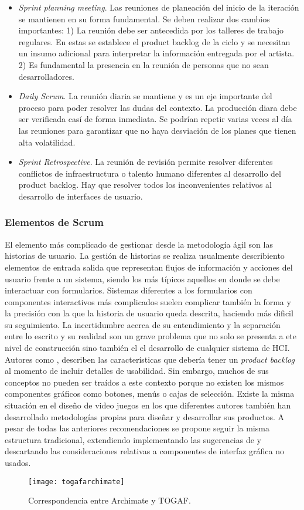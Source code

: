 \begin{itemize}

  \item \textit{Sprint planning meeting}. Las reuniones de planeación del inicio de la iteración se mantienen en su forma fundamental. Se deben realizar dos cambios importantes: 1) La reunión debe ser antecedida por los talleres de trabajo regulares. En estas se establece el product backlog de la ciclo y se necesitan un insumo adicional para interpretar la información entregada por el artista. 2)  Es fundamental la presencia en la reunión de personas que no sean desarrolladores.

  \item \textit{Daily Scrum}. La reunión diaria se mantiene y es un eje importante del proceso para poder resolver las dudas del contexto. La producción diara debe ser verificada casí de forma inmediata. Se podrían repetir varias veces al día las reuniones para garantizar que no haya desviación de los planes que tienen alta volatilidad.

  \item \textit{Sprint Retrospective}. La reunión de revisión permite resolver diferentes conflictos de infraestructura o talento humano diferentes al desarrollo del product backlog. Hay que resolver todos los inconvenientes relativos al desarrollo de interfaces de usuario.

\end{itemize}

\subsubsection{Elementos de Scrum}

El elemento más complicado de gestionar desde la metodología ágil son las historias de usuario. La gestión de historias se realiza usualmente describiento elementos de entrada salida que representan flujos de información y acciones del usuario frente a un sistema, siendo los más típicos aquellos en donde se debe interactuar con formularios. Sistemas diferentes a los formularios con componentes interactivos más complicados suelen complicar también la forma y la precisión con la que la historia de usuario queda descrita, haciendo más dificil su seguimiento. La incertidumbre acerca de su entendimiento y la separación entre lo escrito y su realidad son un grave problema que no solo se presenta a ete nivel de construcción sino también el el desarrollo de cualquier sistema de HCI. Autores como \cite{moreno2012agile}, describen las características que debería tener un \textit{product backlog} al momento de incluir detalles de usabilidad. Sin embargo, muchos de sus conceptos no pueden ser traídos a este contexto porque no existen los mismos componentes gráficos como botones, menús o cajas de selección. Existe la misma situación en el diseño de video juegos en los que diferentes autores también han desarrollado metodologías propias para diseñar y desarrollar sus productos. A pesar de todas las anteriores recomendaciones se propone seguir la misma estructura tradicional, extendiendo implementando las sugerencias de \cite{moreno2012agile} y descartando las consideraciones relativas a componentes de interfaz gráfica no usados.

\begin{figure}[h]
\label{togafarchimate}
\centering
\texttt{[image: togafarchimate]}
\caption{Correspondencia entre Archimate y TOGAF.}
\end{figure}
